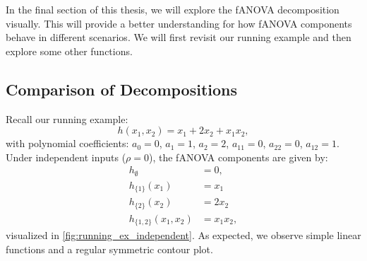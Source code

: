 In the final section of this thesis, we will explore the fANOVA decomposition visually. This will provide a better understanding for how fANOVA components behave in different scenarios. We will first revisit our running example and then explore some other functions.
\subsection{Comparison of Decompositions}
Recall our running example:
$$h(x_1, x_2) = x_1 + 2 x_2 + x_1 x_2,$$
with polynomial coefficients: $a_0 = 0$, $a_1 = 1$, $a_2 = 2$, $a_{11} = 0$, $a_{22} = 0$, $a_{12} = 1$.
Under independent inputs ($\rho = 0$), the fANOVA components are given by:
\begin{align*}
h_{\emptyset} &= 0, \\
h_{\{1\}}(x_1) &= x_1\\
h_{\{2\}}(x_2) &= 2x_2\\
h_{\{1,2\}}(x_1, x_2) &= x_1x_2,
\end{align*}
visualized in \autoref{fig:running_ex_independent}. As expected, we observe simple linear functions and a regular symmetric contour plot.
